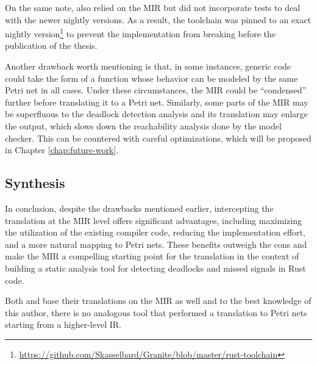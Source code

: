 \documentclass[../../Thesis.tex]{subfiles}
\begin{document}
On the same note, \cite{meyer2020} also relied on the \acrshort{MIR}
but did not incorporate tests to deal with the newer nightly versions.
As a result, the toolchain was pinned to an exact nightly
version\footnote{\url{https://github.com/Skasselbard/Granite/blob/master/rust-toolchain}}
to prevent the implementation from breaking before the publication of the thesis.

Another drawback worth mentioning is that, in some instances,
generic code could take the form of a function whose behavior can be modeled
by the same Petri net in all cases.
Under these circumstances, the \acrshort{MIR} could be ``condensed'' further
before translating it to a Petri net.
Similarly, some parts of the \acrshort{MIR} may be superfluous
to the deadlock detection analysis and its translation may enlarge the output,
which slows down the reachability analysis done by the model checker.
This can be countered with careful optimizations,
which will be proposed in Chapter \ref{chap:future-work}.

\subsection{Synthesis}

In conclusion, despite the drawbacks mentioned earlier,
intercepting the translation at the \acrshort{MIR} level offers significant advantages,
including maximizing the utilization of the existing compiler code,
reducing the implementation effort, and a more natural mapping to Petri nets.
These benefits outweigh the cons and make the \acrshort{MIR}
a compelling starting point for the translation
in the context of building a static analysis tool
for detecting deadlocks and missed signals in Rust code.

Both \cite{meyer2020} and \cite{zhang2022deadlocks} base their translations
on the \acrshort{MIR} as well and to the best knowledge of this author, there is
no analogous tool that performed a translation to Petri nets
starting from a higher-level \acrshort{IR}.
\end{document}
